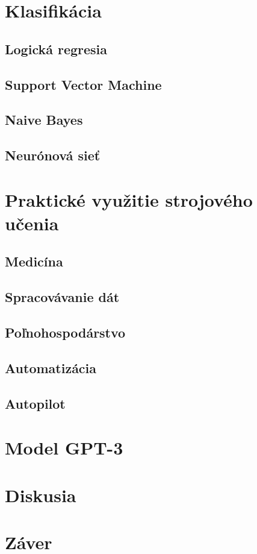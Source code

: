 \documentclass[8pt,twoside,slovak,a4paper]{article}
\begin{document}
\section{Klasifikácia} \label{regresia}
\subsection{Logická regresia} \label{logickareg}
\subsection{Support Vector Machine}
\subsection{Naive Bayes}
\subsection{Neurónová sieť}

\section{Praktické využitie strojového učenia} \label{vyuzitie}
\subsection{Medicína}
\subsection{Spracovávanie dát}
\subsection{Poľnohospodárstvo}
\subsection{Automatizácia}
\subsection{Autopilot}

\section{Model GPT-3} \label{gpt}

\section{Diskusia} \label{diskusia}

\section{Záver} \label{zaver} %





%
\end{document}
